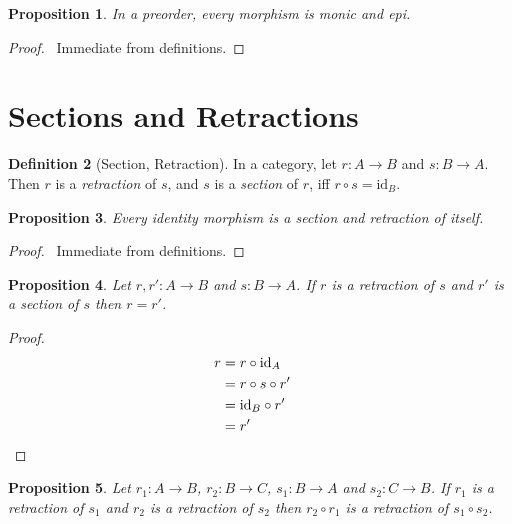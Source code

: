 \documentclass{book}
\let\qed\relax
\newtheorem{prop}{Proposition}[chapter]
\theoremstyle{definition}
\newtheorem{df}[prop]{Definition}
\newcommand{\id}[1]{\ensuremath{\mathrm{id}_{#1}}}
\begin{document}
\begin{prop}
    In a preorder, every morphism is monic and epi.
\end{prop}

\begin{proof}
    \pf\ Immediate from definitions. \qed
\end{proof}

\section{Sections and Retractions}

\begin{df}[Section, Retraction]
    In a category, let $r : A \rightarrow B$ and $s : B \rightarrow A$. Then $r$ is a \emph{retraction} of $s$, and $s$ is a \emph{section} of $r$, iff $r \circ s = \id{B}$.
\end{df}

\begin{prop}
    Every identity morphism is a section and retraction of itself.
\end{prop}

\begin{proof}
    \pf\ Immediate from definitions. \qed
\end{proof}

\begin{prop}
    \label{prop:retraction-is-section}
    Let $r,r' : A \rightarrow B$ and $s : B \rightarrow A$.
    If $r$ is a retraction of $s$ and $r'$ is a section of $s$ then $r = r'$.
\end{prop}

\begin{proof}
    \pf
    \begin{align*}
        r & = r \circ \id{A} \\
        & = r \circ s \circ r' \\
        & = \id{B} \circ r' \\
        & = r' & \qed
    \end{align*}
\end{proof}

\begin{prop}
    \label{prop:retraction-comp}
    Let $r_1 : A \rightarrow B$, $r_2 : B \rightarrow C$, $s_1 : B \rightarrow A$ and $s_2 : C \rightarrow B$. If $r_1$ is a retraction of $s_1$ and $r_2$ is a retraction of $s_2$ then $r_2 \circ r_1$ is a retraction of $s_1 \circ s_2$.
\end{prop}
\end{document}
